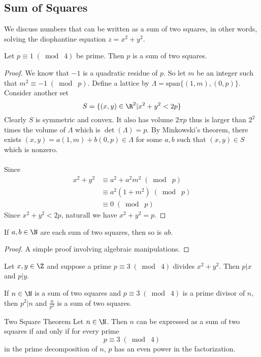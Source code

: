 \documentclass[a4paper]{article}
\begin{document}
\subsection{Sum of Squares}
We discuss numbers that can be written as a sum of two squares, in other words, solving the diophantine equation $z=x^2+y^2$. 
\begin{thm}{}{} Let $p\equiv 1\;(\bmod\;4)$ be prime. Then $p$ is a sum of two squares. \tcbline
\begin{proof}
We know that $-1$ is a quadratic residue of $p$. So let $m$ be an integer such that $m^2\equiv -1\;(\bmod\;p)$. Define a lattice by $\Lambda=\text{span}\{(1,m),(0,p)\}$. Consider another set $$S=\{(x,y)\in\R^2|x^2+y^2<2p\}$$ Clearly $S$ is symmetric and convex. It also has volume $2\pi p$ thus is larger than $2^2$ times the volume of $\Lambda$ which is $\det(\Lambda)=p$. By Minkowski's theorem, there exists $(x,y)=a(1,m)+b(0,p)\in\Lambda$ for some $a,b$ such that $(x,y)\in S$ which is nonzero. \\~\\
Since 
\begin{align*}
x^2+y^2&\equiv a^2+a^2m^2\;(\bmod\;p)\\
&\equiv a^2(1+m^2)\;(\bmod\;p)\\
&\equiv 0\;(\bmod\;p)
\end{align*}
Since $x^2+y^2<2p$, naturall we have $x^2+y^2=p$. 
\end{proof}
\end{thm}

\begin{lmm}{}{} If $a,b\in\N$ are each sum of two squares, then so is $ab$. \tcbline
\begin{proof}
A simple proof involving algebraic manipulations. 
\end{proof}
\end{lmm}

\begin{lmm}{}{} Let $x,y\in\Z$ and suppose a prime $p\equiv 3\;(\bmod\;4)$ divides $x^2+y^2$. Then $p|x$ and $p|y$. 
\end{lmm}

\begin{crl}{}{} If $n\in\N$ is a sum of two squares and $p\equiv 3\;(\bmod\;4)$ is a prime divisor of $n$, then $p^2|n$ and $\frac{n}{p^2}$ is a sum of two squares. 
\end{crl}

\begin{thm}{Two Square Theorem}{} Let $n\in\N$. Then $n$ can be expressed as a sum of two squares if and only if for every prime $$p\equiv 3\;(\bmod\;4)$$ in the prime decomposition of $n$, $p$ has an even power in the factorization. 
\end{thm}
\end{document}
